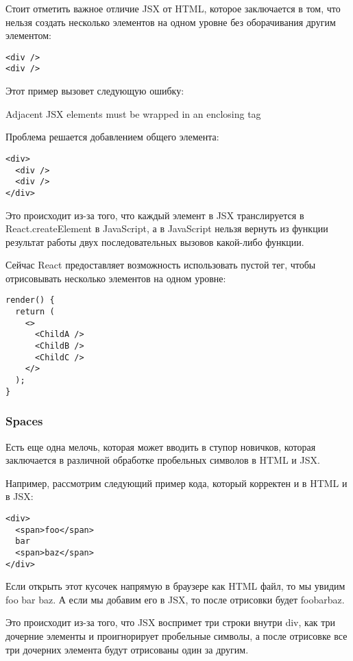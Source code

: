 Стоит отметить важное отличие JSX от HTML, которое заключается в том, что нельзя создать несколько элементов на одном уровне без оборачивания другим элементом:

\begin{lstlisting}
<div />
<div />
\end{lstlisting}

Этот пример вызовет следующую ошибку:

Adjacent JSX elements must be wrapped in an enclosing tag

Проблема решается добавлением общего элемента:

\begin{lstlisting}
<div> 
  <div />
  <div />
</div>
\end{lstlisting}
   
Это происходит из-за того, что каждый элемент в JSX транслируется в React.createElement в JavaScript, а в JavaScript нельзя вернуть из функции результат работы двух последовательных вызовов какой-либо функции.

Сейчас React предоставляет возможность использовать пустой тег, чтобы отрисовывать несколько элементов на одном уровне:

\begin{lstlisting}
render() {
  return (
    <>
      <ChildA />
      <ChildB />
      <ChildC />
    </>
  );
}
\end{lstlisting}
  
\subsubsection*{Spaces}   

Есть еще одна мелочь, которая может вводить в ступор новичков, которая заключается в различной обработке пробельных символов в HTML и JSX.

Например, рассмотрим следующий пример кода, который корректен и в HTML и в JSX:

\begin{lstlisting}
<div>
  <span>foo</span>
  bar
  <span>baz</span>
</div>
\end{lstlisting}

Если открыть этот кусочек напрямую в браузере как HTML файл, то мы увидим foo bar baz. А если мы добавим его в JSX, то после отрисовки будет foobarbaz.

Это происходит из-за того, что JSX воспримет три строки внутри div, как три дочерние элементы и проигнорирует пробельные символы, а после отрисовке все три дочерних элемента будут отрисованы один за другим.

